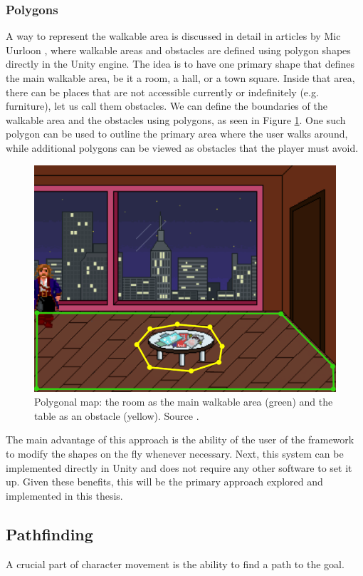 \subsubsection{Polygons}
\label{Analysis:Polygon}
A way to represent the walkable area is discussed in detail in articles by Mic Uurloon \cite{Uurloon1}\cite{Uurloon2}, where walkable areas and obstacles are defined using polygon shapes directly in the Unity engine. The idea is to have one primary shape that defines the main walkable area, be it a room, a hall, or a town square. Inside that area, there can be places that are not accessible currently or indefinitely (e.g. furniture), let us call them obstacles. We can define the boundaries of the walkable area and the obstacles using polygons, as seen in Figure \ref{fig:WS:Poly}. One such polygon can be used to outline the primary area where the user walks around, while additional polygons can be viewed as obstacles that the player must avoid.

\begin{figure}[H]
\centering
\includegraphics[width=.7\linewidth]{img/WS-polygons4.png}
\caption{Polygonal map: the room as the main walkable area (green) and the table as an obstacle (yellow). Source \cite{Uurloon1}.}
\label{fig:WS:Poly}
\end{figure}

The main advantage of this approach is the ability of the user of the framework to modify the shapes on the fly whenever necessary. Next, this system can be implemented directly in Unity and does not require any other software to set it up. Given these benefits, this will be the primary approach explored and implemented in this thesis. 


\subsection{Pathfinding}
A crucial part of character movement is the ability to find a path to the goal.

